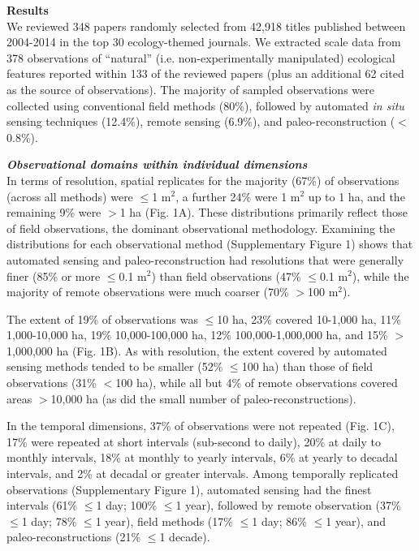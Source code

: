 \documentclass[12pt]{article}
\begin{document}
\vspace{10pt}
\noindent \textbf{Results}
\vspace{5pt}
\\
We reviewed 348 papers randomly selected from 42,918 titles published between 2004-2014 in the top 30 ecology-themed journals. We extracted scale data from 378 observations of ``natural'' (i.e. non-experimentally manipulated) ecological features reported within 133 of the reviewed papers (plus an additional 62 cited as the source of observations). The majority of sampled observations were collected using conventional field methods (80\%), followed by automated \emph{in situ} sensing techniques (12.4\%), remote sensing (6.9\%), and paleo-reconstruction ($<$0.8\%). 

\vspace{5pt}
\noindent \textbf{\emph{Observational domains within individual dimensions}}\\
In terms of resolution, spatial replicates for the majority (67\%) of observations (across all methods) were $\leq$1 m$^2$, a further 24\% were 1 m$^2$ up to 1 ha, and the remaining 9\% were $>$1 ha (Fig. 1A). These distributions primarily reflect those of field observations, the dominant observational methodology. Examining the distributions for each observational method (Supplementary Figure 1) shows that automated sensing and paleo-reconstruction had resolutions that were generally finer (85\% or more $\leq$0.1 m$^2$) than field observations (47\% $\leq$0.1 m$^2$), while the majority of remote observations were much coarser (70\% $>$100 m$^2$).   

The extent of 19\% of observations was $\leq$10 ha, 23\% covered 10-1,000 ha, 11\% 1,000-10,000 ha, 19\% 10,000-100,000 ha, 12\% 100,000-1,000,000 ha, and 15\% $>$1,000,000 ha (Fig. 1B).  As with resolution, the extent covered by automated sensing methods tended to be smaller (52\% $\leq$100 ha) than those of field observations (31\% $<$100 ha), while all but 4\% of remote observations covered areas $>$10,000 ha (as did the small number of paleo-reconstructions).  


In the temporal dimensions, 37\% of observations were not repeated (Fig. 1C), 17\% were repeated at short intervals (sub-second to daily), 20\% at daily to monthly intervals, 18\% at monthly to yearly intervals, 6\% at yearly to decadal intervals, and 2\% at decadal or greater intervals. Among temporally replicated observations (Supplementary Figure 1), automated sensing had the finest intervals (61\% $\leq$1 day; 100\% $\leq$1 year), followed by remote observation (37\% $\leq$1 day; 78\% $\leq$1 year), field methods (17\% $\leq$1 day; 86\% $\leq$1 year), and paleo-reconstructions (21\% $\leq$1 decade).   
\end{document}
